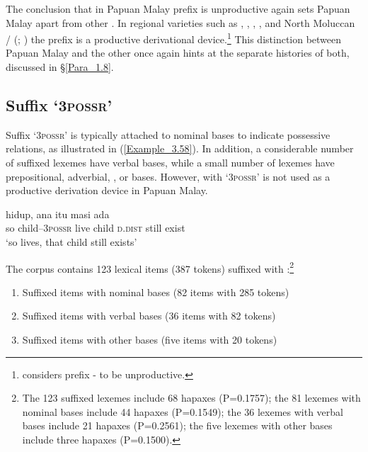 The conclusion that in Papuan Malay prefix  is unproductive again sets Papuan Malay apart from other . In regional varieties such as  \citep[96–98]{vanMinde.1997},  \citep[249–250]{Paauw.2009},  \citep[253–255]{Paauw.2009},  \citep[18–22]{Stoel.2005}, and North Moluccan /  (\citealt[18]{Taylor.1983}; \citealt[125--127]{Litamahuputty.2012}) the prefix is a productive derivational device.\footnote{{\citet[4]{Voorhoeve.1983}} considers prefix - to be unproductive.} This distinction between Papuan Malay and the other  once again hints at the separate histories of both, discussed in §\ref{Para_1.8}.


\subsection{Suffix  ‘\textsc{3possr}’}\label{Para_3.1.6}

Suffix  ‘\textsc{3possr}’ is typically attached to nominal bases to indicate possessive relations, as illustrated in (\ref{Example_3.58}). In addition, a considerable number of suffixed lexemes have verbal bases, while a small number of lexemes have prepositional, adverbial, , or  bases. However,  with  ‘\textsc{3possr}’ is not used as a productive derivation device in Papuan Malay.


\ea
\label{Example_3.58}
 {} {hidup,} {ana} {itu} {masi} {ada}\\ %
 so  child–\textsc{3possr}  live  child  \textsc{d.dist}  still  exist\\
\glt 
‘so  lives, that child still exists’ \textstyleExampleSource{[080921-005-CvNP.0007]}
\z



The corpus contains 123 lexical items (387 tokens) suffixed with :\footnote{The 123 suffixed lexemes include 68 hapaxes (P=0.1757); the 81 lexemes with nominal bases include 44 hapaxes (P=0.1549); the 36 lexemes with verbal bases include 21 hapaxes (P=0.2561); the five lexemes with other bases include three hapaxes (P=0.1500).}



\begin{enumerate}
\item 
Suffixed items with nominal bases (82 items with 285 tokens)
\item 
Suffixed items with verbal bases (36 items with 82 tokens)
\item 
Suffixed items with other bases (five items with 20 tokens)

\end{enumerate}

